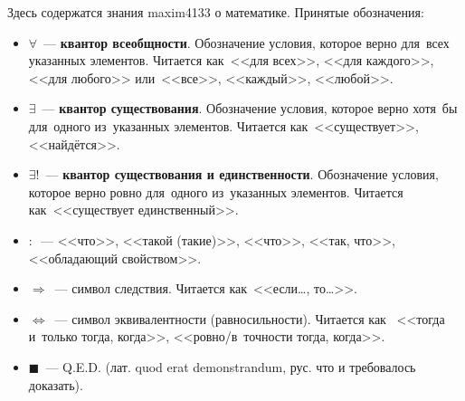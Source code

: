 Здесь содержатся знания maxim4133 о математике. Принятые обозначения:
\begin{itemize}
	\item $\forall$~--- \textbf{квантор всеобщности}. Обозначение условия, которое верно для~всех
	указанных элементов. Читается как~<<для всех>>, <<для каждого>>, <<для любого>> или~<<все>>,
	<<каждый>>, <<любой>>.
	\item $\exists$~--- \textbf{квантор существования}. Обозначение условия, которое верно хотя~бы
	для~одного из~указанных элементов. Читается как~<<существует>>, <<найдётся>>.
	\item $\exists!$~--- \textbf{квантор существования и единственности}. Обозначение условия,
	которое верно ровно для~одного из~указанных элементов. Читается как~<<существует единственный>>.
	\item $\colon$~--- <<что>>, <<такой (такие)>>, <<что>>, <<так, что>>, <<обладающий свойством>>.
	\item $\Rightarrow$~--- символ следствия. Читается как~<<если\dots, то\dots>>.
	\item $\Leftrightarrow$~--- символ эквивалентности (равносильности). Читается как
	~<<тогда и~только тогда, когда>>, <<ровно/в~точности тогда, когда>>.
	\item $\scriptstyle \blacksquare$~--- Q.E.D. (лат. quod erat demonstrandum, рус. что и требовалось доказать).
\end{itemize}